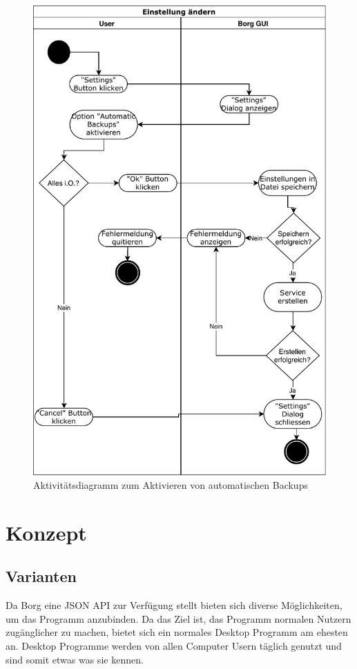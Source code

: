 \begin{figure}[htbp]
\centering
\includegraphics[width=.9\linewidth]{pictures/activity_automatic.pdf}
\caption{\label{fig:orge9f0020}
Aktivitätsdiagramm zum Aktivieren von automatischen Backups}
\end{figure}
\newpage
\section{Konzept}
\label{sec:orge7882d5}

\subsection{Varianten}
\label{sec:orgfa272c2}

Da Borg eine JSON API zur Verfügung stellt bieten sich diverse Möglichkeiten, um
das Programm anzubinden. Da das Ziel ist, das Programm normalen Nutzern
zugänglicher zu machen, bietet sich ein normales Desktop Programm am ehesten
an. Desktop Programme werden von allen Computer Usern täglich genutzt und sind
somit etwas was sie kennen.


